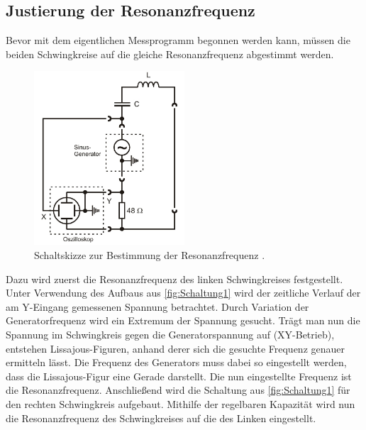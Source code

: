 \subsection{Justierung der Resonanzfrequenz}
\label{subsec:Justierung}
Bevor mit dem eigentlichen Messprogramm begonnen werden kann, müssen die beiden Schwingkreise auf die gleiche Resonanzfrequenz abgestimmt werden.
\begin{figure}
    \centering
	\includegraphics[width=0.5\textwidth]{content/Schaltung1.jpg}
    \caption{Schaltskizze zur Bestimmung der Resonanzfrequenz \cite{v355}.}
    \label{fig:Schaltung1}
\end{figure}
Dazu wird zuerst die Resonanzfrequenz des linken Schwingkreises festgestellt. Unter Verwendung des Aufbaus aus \autoref{fig:Schaltung1} wird 
der zeitliche Verlauf der am Y-Eingang gemessenen Spannung betrachtet. Durch Variation der Generatorfrequenz wird ein Extremum der Spannung gesucht. Trägt 
man nun die Spannung im Schwingkreis gegen die Generatorspannung auf (XY-Betrieb), entstehen Lissajous-Figuren, anhand derer sich die gesuchte Frequenz genauer
ermitteln lässt. Die Frequenz des Generators muss dabei so eingestellt werden, dass die Lissajous-Figur eine Gerade darstellt. Die nun eingestellte Frequenz ist
die Resonanzfrequenz. Anschließend wird die Schaltung aus \autoref{fig:Schaltung1} für den rechten Schwingkreis aufgebaut. Mithilfe der regelbaren Kapazität
wird nun die Resonanzfrequenz des Schwingkreises auf die des Linken eingestellt.

